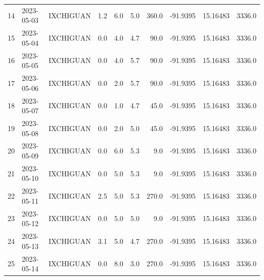 \documentclass[12pt]{article}
\begin{document}
\begin{center}
\begin{tabular}{lllrrrrrrr}
14  & 2023-05-03 &  IXCHIGUAN &     1.2 &  6.0 &         5.0 &       360.0 &  -91.9395 &  15.16483 &   3336.0 \\
15  & 2023-05-04 &  IXCHIGUAN &     0.0 &  4.0 &         4.7 &        90.0 &  -91.9395 &  15.16483 &   3336.0 \\
16  & 2023-05-05 &  IXCHIGUAN &     0.0 &  4.0 &         5.7 &        90.0 &  -91.9395 &  15.16483 &   3336.0 \\
17  & 2023-05-06 &  IXCHIGUAN &     0.0 &  2.0 &         5.7 &        90.0 &  -91.9395 &  15.16483 &   3336.0 \\
18  & 2023-05-07 &  IXCHIGUAN &     0.0 &  1.0 &         4.7 &        45.0 &  -91.9395 &  15.16483 &   3336.0 \\
19  & 2023-05-08 &  IXCHIGUAN &     0.0 &  2.0 &         5.0 &        45.0 &  -91.9395 &  15.16483 &   3336.0 \\
20  & 2023-05-09 &  IXCHIGUAN &     0.0 &  6.0 &         5.3 &         9.0 &  -91.9395 &  15.16483 &   3336.0 \\
21  & 2023-05-10 &  IXCHIGUAN &     0.0 &  5.0 &         5.3 &         9.0 &  -91.9395 &  15.16483 &   3336.0 \\
22  & 2023-05-11 &  IXCHIGUAN &     2.5 &  5.0 &         5.3 &       270.0 &  -91.9395 &  15.16483 &   3336.0 \\
23  & 2023-05-12 &  IXCHIGUAN &     0.0 &  5.0 &         5.0 &         9.0 &  -91.9395 &  15.16483 &   3336.0 \\
24  & 2023-05-13 &  IXCHIGUAN &     3.1 &  5.0 &         4.7 &       270.0 &  -91.9395 &  15.16483 &   3336.0 \\
25  & 2023-05-14 &  IXCHIGUAN &     0.0 &  8.0 &         3.0 &       270.0 &  -91.9395 &  15.16483 &   3336.0 \\
\bottomrule
\end{tabular}

        
        \end{center}
        
\end{document}
